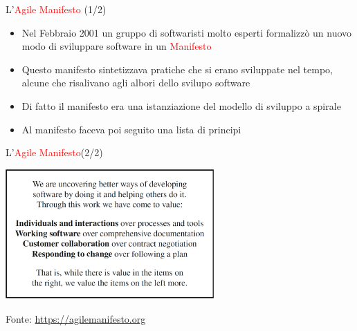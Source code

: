 \documentclass{beamer}
\begin{document}
\begin{frame}{\centerline{L'\textcolor{red}{Agile Manifesto} (1/2)}}
\begin{itemize}
    \item Nel Febbraio 2001 un gruppo di softwaristi molto esperti formalizz\`{o} un nuovo modo di sviluppare software in un \textcolor{red}{Manifesto}
    \item Questo manifesto sintetizzava pratiche che si erano sviluppate nel tempo, alcune che risalivano agli albori dello svilupo software
    \item Di fatto il manifesto era una istanziazione del modello di sviluppo a spirale
    \item Al manifesto faceva poi seguito una lista di principi
\end{itemize}
\end{frame}


\begin{frame}{\centerline{L'\textcolor{red}{Agile Manifesto}(2/2)}}

\begin{center}
\includegraphics[width=80mm]{A2022.IDSEPC.ProcessoDiProduzione/img-img00.png}
\end{center}
\begin{center}
\tiny
Fonte: \url{https://agilemanifesto.org}
\end{center}

\end{frame}
\end{document}

